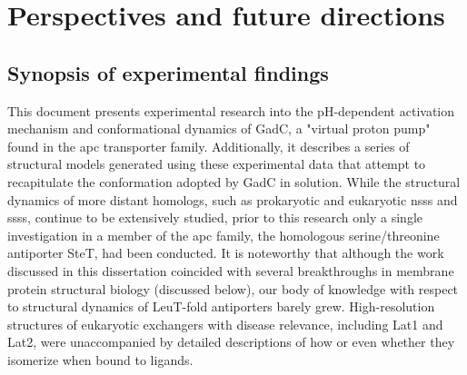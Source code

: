 \clearpage %

\chapter{Perspectives and future directions}\label{ch:conclusions}

\section{Synopsis of experimental findings}


This document presents experimental research into the pH-dependent activation mechanism and conformational dynamics of GadC, a "virtual proton pump" found in the \gls{apc} transporter family. Additionally, it describes a series of structural models generated using these experimental data that attempt to recapitulate the conformation adopted by GadC in solution. While the structural dynamics of more distant homologs, such as prokaryotic and eukaryotic \gls{nss}s and \gls{sss}s, continue to be extensively studied, prior to this research only a single investigation in a member of the \gls{apc} family, the homologous serine/threonine antiporter SteT, had been conducted. It is noteworthy that although the work discussed in this dissertation coincided with several breakthroughs in membrane protein structural biology (discussed below), our body of knowledge with respect to structural dynamics of LeuT-fold antiporters barely grew. High-resolution structures of eukaryotic exchangers with disease relevance, including Lat1 and Lat2, were unaccompanied by detailed descriptions of how or even whether they isomerize when bound to ligands.

